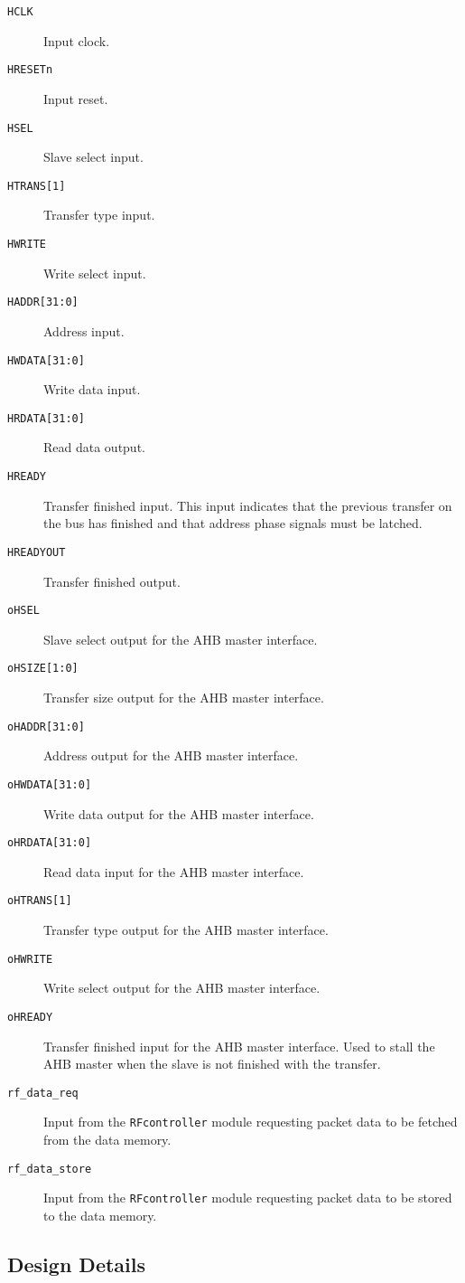 \begin{description}
	\item[\texttt{HCLK}] Input clock.
	\item[\texttt{HRESETn}] Input reset.
	\item[\texttt{HSEL}] Slave select input.
	\item[\texttt{HTRANS[1]}] Transfer type input.
	\item[\texttt{HWRITE}] Write select input.
	\item[\texttt{HADDR[31:0]}] Address input.
	\item[\texttt{HWDATA[31:0]}] Write data input.
	\item[\texttt{HRDATA[31:0]}] Read data output.
	\item[\texttt{HREADY}] Transfer finished input. This input indicates that the previous transfer on the bus has finished and that address phase signals must be latched.
	\item[\texttt{HREADYOUT}] Transfer finished output.
	\item[\texttt{oHSEL}] Slave select output for the AHB master interface.
	\item[\texttt{oHSIZE[1:0]}] Transfer size output for the AHB master interface.
	\item[\texttt{oHADDR[31:0]}] Address output for the AHB master interface.
	\item[\texttt{oHWDATA[31:0]}] Write data output for the AHB master interface.
	\item[\texttt{oHRDATA[31:0]}] Read data input for the AHB master interface.
	\item[\texttt{oHTRANS[1]}] Transfer type output for the AHB master interface.
	\item[\texttt{oHWRITE}] Write select output for the AHB master interface.
	\item[\texttt{oHREADY}] Transfer finished input for the AHB master interface. Used to stall the AHB master when the slave is not finished with the transfer.
	\item[\texttt{rf\_data\_req}] Input from the \texttt{RFcontroller} module requesting packet data to be fetched from the data memory.
	\item[\texttt{rf\_data\_store}] Input from the \texttt{RFcontroller} module requesting packet data to be stored to the data memory.
\end{description}

\subsection{Design Details}

